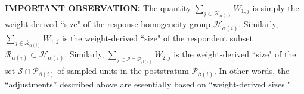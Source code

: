 \noindent
\textbf{IMPORTANT OBSERVATION:}\;\; The quantity $\displaystyle{\sum_{j\in \mathcal{H}_{\alpha(i)}}} W_{1,j}$ is simply the weight-derived ``size" of the response homogeneity group $\mathcal{H}_{\alpha(i)}$.
Similarly, $\displaystyle{\sum_{j\in \mathcal{R}_{\alpha(i)}}} W_{1,j}$ is the weight-derived ``size" of the respondent subset $\mathcal{R}_{\alpha(i)} \subset \mathcal{H}_{\alpha(i)}$.  Similarly, $\displaystyle{\sum_{j\in\mathcal{S}\cap\mathcal{P}_{\beta(i)}}} W_{2,j}$ is the weight-derived ``size" of the set $\mathcal{S}\cap\mathcal{P}_{\beta(i)}$ of sampled units in the poststratum $\mathcal{P}_{\beta(i)}$.  In other words, the ``adjustments'' described above are essentially based on ``weight-derived sizes."


\renewcommand{\theenumi}{\roman{enumi}}
\renewcommand{\labelenumi}{\textnormal{(\theenumi)}$\;\;$}


